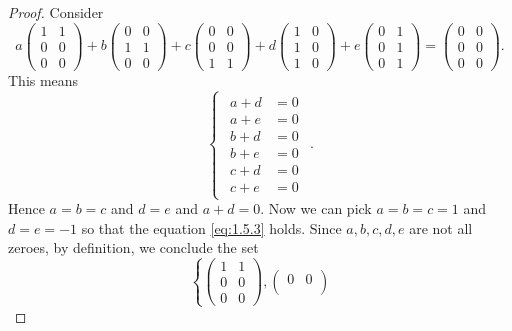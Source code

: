 \begin{Exercise}
\begin{proof}
Consider
\begin{equation}\label{eq:1.5.3}
a\begin{pmatrix}
1 & 1 \\
0 & 0 \\
0 & 0
\end{pmatrix} + b\begin{pmatrix}
0 & 0 \\
1 & 1 \\
0 & 0
\end{pmatrix} + c\begin{pmatrix}
0 & 0 \\
0 & 0 \\
1 & 1
\end{pmatrix} + d\begin{pmatrix}
1 & 0 \\
1 & 0 \\
1 & 0
\end{pmatrix} + e\begin{pmatrix}
0 & 1 \\
0 & 1 \\
0 & 1
\end{pmatrix} = \begin{pmatrix}
0 & 0 \\
0 & 0 \\
0 & 0
\end{pmatrix}.
\end{equation}
This means
$$
\begin{cases}
\begin{aligned}
a+d &= 0 \\
a+e &= 0 \\
b+d &= 0 \\
b+e &= 0 \\
c+d &= 0 \\
c+e &= 0
\end{aligned}
\end{cases}.
$$
Hence $a=b=c$ and $d=e$ and $a+d=0$. Now we can pick $a=b=c=1$ and $d=e=-1$ so that the equation \eqref{eq:1.5.3} holds. Since $a,b,c,d,e$ are not all zeroes, by definition, we conclude the set
$$
\left\{\begin{pmatrix}
1 & 1 \\
0 & 0 \\
0 & 0
\end{pmatrix} , \begin{pmatrix}
0 & 0 \\

\end{pmatrix}$$
\end{proof}
\end{Exercise}
